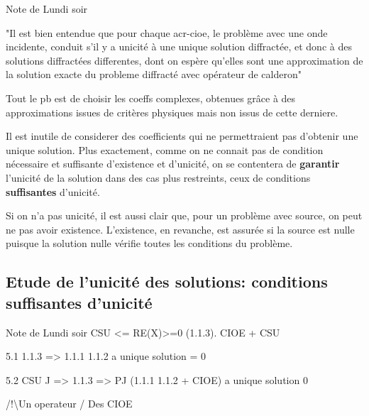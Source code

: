 \documentclass[12pt,%
    twoside,%
    a4paper,%
    openright, %
    ]{book}
\numberwithin{equation}{section} %
\newcounter{REM}
\newenvironment{REM}[1][\theREM]
    {%
        \stepcounter{REM}
        \hypertarget{REM#1}{}%
        \pdfbookmark[0]{REM \theREM}{REM#1}
        \begin{tcolorbox}[%
                title={Remarque \theREM},%
                colback=red!30!white,%
                colframe=red!75!black,%
            ]
    }
    {
        \end{tcolorbox}%
    }%
\begin{document}
        \begin{REM}
            Note de Lundi soir

            "Il est bien entendue que pour chaque \gls{acr-cioe}, le problème avec une onde incidente, conduit s'il y a unicité à une unique solution diffractée, et donc à des solutions diffractées differentes, dont on espère qu'elles sont une approximation de la solution exacte du probleme diffracté avec opérateur de calderon"

            Tout le pb est de choisir les coeffs complexes, obtenues grâce à des approximations issues de critères physiques mais non issus de cette derniere. 

            Il est inutile de considerer des coefficients qui ne permettraient pas d'obtenir une unique solution. Plus exactement, comme on ne connait pas de condition nécessaire et suffisante d'existence et d'unicité, on se contentera de {\bf garantir} l'unicité de la solution dans des cas plus restreints, ceux de conditions {\bf suffisantes} d'unicité. 
            
            Si on n'a pas unicité, il est aussi clair que, pour un problème avec source, on peut ne pas avoir existence. L'existence, en revanche, est assurée si la source est nulle puisque la solution nulle vérifie toutes les conditions du problème.
        \end{REM}

    \subsection{Etude de l'unicité des solutions: conditions suffisantes d'unicité}

        \begin{REM}
            Note de Lundi soir
            CSU <= RE(X)>=0 (1.1.3). CIOE + CSU

            5.1 1.1.3 => 1.1.1 1.1.2 a  unique solution = 0

            5.2 CSU J => 1.1.3 => PJ (1.1.1 1.1.2 + CIOE) a unique solution 0

            /!\textbackslash  Un operateur / Des CIOE
        \end{REM}


\backmatter
\appendix
\printbibliography
\end{document}
